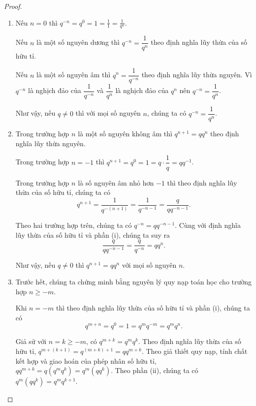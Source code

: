 \begin{proof}
    \begin{enumerate}[label={(\roman*)}]
        \item Nếu $n = 0$ thì $q^{-n} = q^{0} = 1 = \frac{1}{1} = \frac{1}{q^{n}}$.

              Nếu $n$ là một số nguyên dương thì $q^{-n} = \dfrac{1}{q^{n}}$ theo định nghĩa lũy thừa của số hữu tỉ.

              Nếu $n$ là một số nguyên âm thì $q^{n} = \dfrac{1}{q^{-n}}$ theo định nghĩa lũy thừa nguyên. Vì $q^{-n}$ là nghịch đảo của $\dfrac{1}{q^{-n}}$ và $\dfrac{1}{q^{n}}$ là nghịch đảo của $q^{n}$ nên $q^{-n} = \dfrac{1}{q^{n}}$.

              Như vậy, nếu $q\ne 0$ thì với mọi số nguyên $n$, chúng ta có $q^{-n} = \dfrac{1}{q^{n}}$.
        \item Trong trường hợp $n$ là một số nguyên không âm thì $q^{n+1} = qq^{n}$ theo định nghĩa lũy thừa nguyên.

              Trong trường hợp $n = -1$ thì $q^{n+1} = q^{0} = 1 = q\cdot\dfrac{1}{q} = qq^{-1}$.

              Trong trường hợp $n$ là số nguyên âm nhỏ hơn $-1$ thì theo định nghĩa lũy thừa của số hữu tỉ, chúng ta có
              \[
                  q^{n+1} = \dfrac{1}{q^{-(n+1)}} = \dfrac{1}{q^{-n-1}} = \dfrac{q}{qq^{-n-1}}.
              \]

              Theo hai trường hợp trên, chúng ta có $q^{-n} = qq^{-n-1}$. Cùng với định nghĩa lũy thừa của số hữu tỉ và phần (i), chúng ta suy ra
              \[
                  \dfrac{q}{qq^{-n-1}} = \dfrac{q}{q^{-n}} = qq^{n}.
              \]

              Như vậy, nếu $q\ne 0$ thì $q^{n+1} = qq^{n}$ với mọi số nguyên $n$.
        \item Trước hết, chúng ta chứng minh bằng nguyên lý quy nạp toán học cho trường hợp $n\geq -m$.

              Khi $n = -m$ thì theo định nghĩa lũy thừa của số hữu tỉ và phần (i), chúng ta có
              \[
                  q^{m + n} = q^{0} = 1 = q^{m}q^{-m} = q^{m}q^{n}.
              \]

              Giả sử với $n = k\geq -m$, có $q^{m+k} = q^{m}q^{k}$. Theo định nghĩa lũy thừa của số hữu tỉ, $q^{m+(k+1)} = q^{(m+k)+1} = qq^{m+k}$. Theo giả thiết quy nạp, tính chất kết hợp và giao hoán của phép nhân số hữu tỉ, $qq^{m+k} = q(q^{m}q^{k}) = q^{m}(qq^{k})$. Theo phần (ii), chúng ta có $q^{m}(qq^{k}) = q^{m}q^{k+1}$.


\end{enumerate}
\end{proof}
